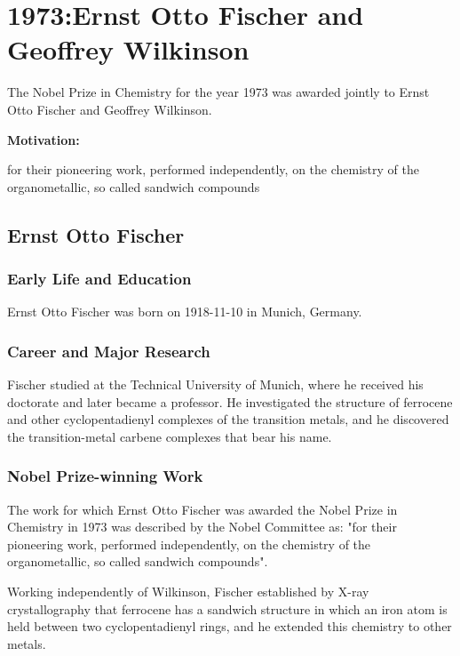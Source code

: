\chapter{1973:Ernst Otto Fischer and Geoffrey Wilkinson}

\label{chap:chemistry1973}

The Nobel Prize in Chemistry for the year 1973 was awarded jointly to Ernst Otto Fischer and Geoffrey Wilkinson.

\textbf{Motivation:}

for their pioneering work, performed independently, on the chemistry of the organometallic, so called sandwich compounds

\section{Ernst Otto Fischer}

\subsection*{Early Life and Education}

Ernst Otto Fischer was born on 1918-11-10 in Munich, Germany.

\subsection*{Career and Major Research}

Fischer studied at the Technical University of Munich, where he received his doctorate and later became a professor. He investigated the structure of ferrocene and other cyclopentadienyl complexes of the transition metals, and he discovered the transition-metal carbene complexes that bear his name.

\subsection*{Nobel Prize-winning Work}

The work for which Ernst Otto Fischer was awarded the Nobel Prize in Chemistry in 1973 was described by the Nobel Committee as: "for their pioneering work, performed independently, on the chemistry of the organometallic, so called sandwich compounds".

Working independently of Wilkinson, Fischer established by X-ray crystallography that ferrocene has a sandwich structure in which an iron atom is held between two cyclopentadienyl rings, and he extended this chemistry to other metals.

